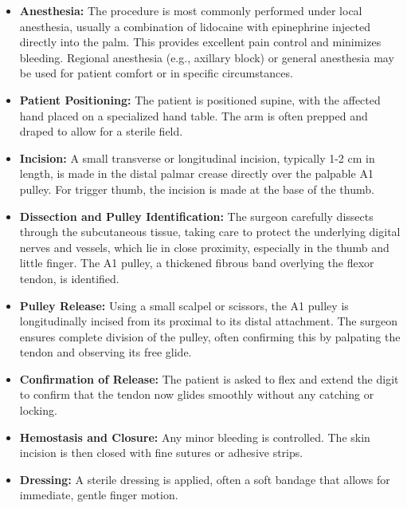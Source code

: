 \begin{itemize}
  \item \textbf{Anesthesia:} The procedure is most commonly performed under local anesthesia, usually a combination of lidocaine with epinephrine injected directly into the palm. This provides excellent pain control and minimizes bleeding. Regional anesthesia (e.g., axillary block) or general anesthesia may be used for patient comfort or in specific circumstances.
  
  \item \textbf{Patient Positioning:} The patient is positioned supine, with the affected hand placed on a specialized hand table. The arm is often prepped and draped to allow for a sterile field.
  
  \item \textbf{Incision:} A small transverse or longitudinal incision, typically 1-2 cm in length, is made in the distal palmar crease directly over the palpable A1 pulley. For trigger thumb, the incision is made at the base of the thumb.
  
  \item \textbf{Dissection and Pulley Identification:} The surgeon carefully dissects through the subcutaneous tissue, taking care to protect the underlying digital nerves and vessels, which lie in close proximity, especially in the thumb and little finger. The A1 pulley, a thickened fibrous band overlying the flexor tendon, is identified.
  
  \item \textbf{Pulley Release:} Using a small scalpel or scissors, the A1 pulley is longitudinally incised from its proximal to its distal attachment. The surgeon ensures complete division of the pulley, often confirming this by palpating the tendon and observing its free glide.
  
  \item \textbf{Confirmation of Release:} The patient is asked to flex and extend the digit to confirm that the tendon now glides smoothly without any catching or locking.
  
  \item \textbf{Hemostasis and Closure:} Any minor bleeding is controlled. The skin incision is then closed with fine sutures or adhesive strips.
  
  \item \textbf{Dressing:} A sterile dressing is applied, often a soft bandage that allows for immediate, gentle finger motion.
\end{itemize}

